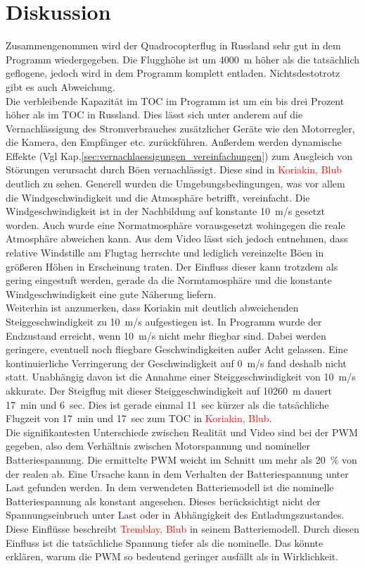\section{Diskussion}
\label{sec:nachbildung_diskussion}
Zusammengenommen wird der Quadrocopterflug in Russland sehr gut in dem Programm wiedergegeben. Die Flugghöhe ist um \SI{4000}{m} höher als die tatsächlich geflogene, jedoch wird in dem Programm komplett entladen. Nichtsdestotrotz gibt es auch Abweichung.\\
Die verbleibende Kapazität im TOC im Programm ist um ein bis drei Prozent höher als im TOC in Russland. Dies lässt sich unter anderem auf die Vernachlässigung des Stromverbrauches zusätzlicher Geräte wie den Motorregler, die Kamera, den Empfänger etc. zurückführen. Außerdem werden dynamische Effekte (Vgl Kap.\ref{sec:vernachlaessigungen_vereinfachungen}) zum Ausgleich von Störungen verursacht durch Böen vernachlässigt. Diese sind in \textcolor{red}{Koriakin, Blub} deutlich zu sehen. Generell wurden die Umgebungsbedingungen, was vor allem die Windgeschwindigkeit und die Atmosphäre betrifft, vereinfacht. Die Windgeschwindigkeit ist in der Nachbildung auf konstante \SI{10}{m/s} gesetzt worden. Auch wurde eine Normatmosphäre vorausgesetzt wohingegen die reale Atmosphäre abweichen kann. Aus dem Video lässt sich jedoch entnehmen, dass relative Windstille am Flugtag herrschte und lediglich vereinzelte Böen in größeren Höhen in Erscheinung traten. Der Einfluss dieser kann trotzdem als gering eingestuft werden, gerade da die Normtamosphäre und die konstante Windgeschwindigkeit eine gute Näherung liefern. \\
Weiterhin ist anzumerken, dass Koriakin mit deutlich abweichenden Steiggeschwindigkeit zu \SI{10}{m/s} aufgestiegen ist. In Programm wurde der Endzustand erreicht, wenn \SI{10}{m/s} nicht mehr fliegbar sind. Dabei werden geringere, eventuell noch fliegbare Geschwindigkeiten außer Acht gelassen. Eine kontinuierliche Verringerung der Geschwindigkeit auf \SI{0}{m/s} fand deshalb nicht statt. Unabhängig davon ist die Annahme einer Steiggeschwindigkeit von \SI{10}{m/s} akkurate. Der Steigflug mit dieser Steiggeschwindigkeit auf \SI{10260}{m} dauert \SI{17}{min} und \SI{6}{sec}. Dies ist gerade einmal \SI{11}{sec} kürzer als die tatsächliche Flugzeit von \SI{17}{min} und \SI{17}{sec} zum TOC in \textcolor{red}{Koriakin, Blub}.\\
Die signifikantesten Unterschiede zwischen Realität und Video sind bei der PWM gegeben, also dem Verhältnis zwischen Motorspannung und nomineller Batteriespannung. Die ermittelte PWM weicht im Schnitt um mehr als \SI{20}{\%} von der realen ab. Eine Ursache kann in dem Verhalten der Batteriespannung unter Last gefunden werden. In dem verwendeten Batteriemodell ist die nominelle Batteriespannung als konstant angesehen. Dieses berücksichtigt nicht der Spannungseinbruch unter Last oder in Abhängigkeit des Entladungszustandes. Diese Einflüsse beschreibt \textcolor{red}{Tremblay, Blub} in seinem Batteriemodell. Durch diesen Einfluss ist die tatsächliche Spannung tiefer als die nominelle. Das könnte erklären, warum die PWM so bedeutend geringer ausfällt als in Wirklichkeit. \\
